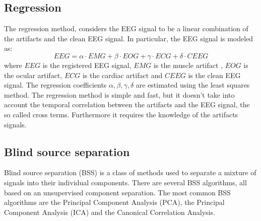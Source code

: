 \documentclass[a4paper]{sapthesis}
\begin{document}
\subsection{Regression}\label{sec:regression}
The regression method\cite{regression}, considers the EEG signal to be a
linear combination of the artifacts and the clean EEG signal. In particular,
the EEG signal is modeled as:
\begin{equation}
\label{eq:regression}
EEG = \alpha \cdot EMG + \beta \cdot EOG + \gamma \cdot ECG + \delta \cdot CEEG
\end{equation}
where $EEG$ is the registered EEG signal, $EMG$ is the muscle artifact
, $EOG$ is the ocular artifact,
$ECG$ is the cardiac artifact
and $CEEG$ is the clean EEG signal. \newline
The regression coefficients $\alpha, \beta, \gamma, \delta$ are estimated
using the least squares method. \newline
The regression method is simple and fast, but it doesn't take into account
the temporal correlation between the artifacts and the EEG signal, the so 
called cross terms. Furthermore it requires the knowledge of the artifacts
signals. \newline
\subsection{Blind source separation}\label{sec:bss}
Blind source separation (BSS)\cite{bss} is a  class of methods used to separate a
mixture of signals into their individual components. 
There are several BSS algorithms, all based on an unsupervised component 
separation. 
The most common BSS algorithms are the Principal Component Analysis (PCA),
the Principal Component Analysis (ICA) and the Canonical Correlation Analysis.
\newline
\end{document}
